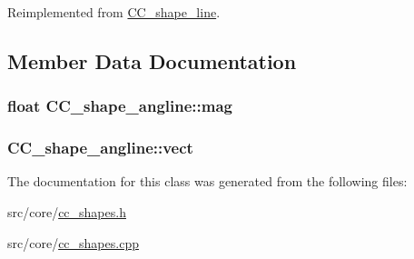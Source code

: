 Reimplemented from \hyperlink{a00043_a8678d21e42e37bece16b3cac98241d98}{C\-C\-\_\-shape\-\_\-line}.



\subsection{Member Data Documentation}
\hypertarget{a00040_af6204d4bf9aadab09dc36e8a7f7c9bf2}{
\subsubsection[{mag}]{\setlength{\rightskip}{0pt plus 5cm}float C\-C\-\_\-shape\-\_\-angline\-::mag\hspace{0.3cm}{\ttfamily [private]}}}\label{a00040_af6204d4bf9aadab09dc36e8a7f7c9bf2}
\hypertarget{a00040_a19ab5a832d2fba6bbef2c0767da54f6c}{
\subsubsection[{vect}]{ C\-C\-\_\-shape\-\_\-angline\-::vect\hspace{0.3cm}{\ttfamily [private]}}}\label{a00040_a19ab5a832d2fba6bbef2c0767da54f6c}


The documentation for this class was generated from the following files\-:\begin{DoxyCompactItemize}
\item 
src/core/\hyperlink{a00210}{cc\-\_\-shapes.\-h}\item 
src/core/\hyperlink{a00209}{cc\-\_\-shapes.\-cpp}\end{DoxyCompactItemize}
